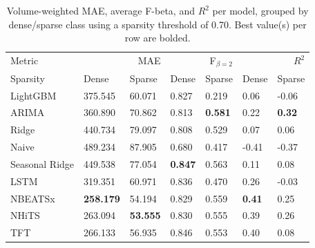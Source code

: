 \begin{table}
\caption{Volume-weighted MAE, average F-beta, and $R^2$ per model, grouped by dense/sparse class using a sparsity threshold of 0.70. Best value(s) per row are bolded.}
\begin{tabular}{lllllll}
\toprule
Metric & \multicolumn{2}{r}{MAE} & \multicolumn{2}{r}{F$_{\beta=2}$} & \multicolumn{2}{r}{$R^2$} \\
Sparsity & Dense & Sparse & Dense & Sparse & Dense & Sparse \\
\midrule
LightGBM & 375.545 & 60.071 & 0.827 & 0.219 & 0.06 & -0.06 \\
ARIMA & 360.890 & 70.862 & 0.813 & \textbf{0.581} & 0.22 & \textbf{0.32} \\
Ridge & 440.734 & 79.097 & 0.808 & 0.529 & 0.07 & 0.06 \\
Naive & 489.234 & 87.905 & 0.680 & 0.417 & -0.41 & -0.37 \\
Seasonal Ridge & 449.538 & 77.054 & \textbf{0.847} & 0.563 & 0.11 & 0.08 \\
LSTM & 319.351 & 60.971 & 0.836 & 0.470 & 0.26 & -0.03 \\
NBEATSx & \textbf{258.179} & 54.194 & 0.829 & 0.559 & \textbf{0.41} & 0.25 \\
NHiTS & 263.094 & \textbf{53.555} & 0.830 & 0.555 & 0.39 & 0.26 \\
TFT & 266.133 & 56.935 & 0.846 & 0.553 & 0.40 & 0.08 \\
\bottomrule
\end{tabular}
\end{table}
